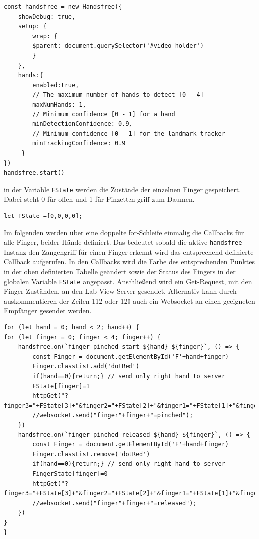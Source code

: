 \documentclass[a4paper,12pt,final]{article} %
\numberwithin{equation}{section} %
\numberwithin{figure}{section} %
\numberwithin{table}{section} %
\begin{document}
\begin{lstlisting}[firstnumber=79]
const handsfree = new Handsfree({
	showDebug: true,
	setup: {
		wrap: {
		$parent: document.querySelector('#video-holder')
		}
	},
	hands:{
		enabled:true,
		// The maximum number of hands to detect [0 - 4]
		maxNumHands: 1,
		// Minimum confidence [0 - 1] for a hand 
		minDetectionConfidence: 0.9,
		// Minimum confidence [0 - 1] for the landmark tracker
		minTrackingConfidence: 0.9
	 }
})
handsfree.start()
\end{lstlisting}

in der Variable \texttt{FState} werden die Zustände der einzelnen Finger gespeichert. Dabei steht 0 für offen und 1 für Pinzetten-griff zum Daumen.
\begin{lstlisting}[firstnumber=101]
let FState =[0,0,0,0];
\end{lstlisting}

Im folgenden werden über eine doppelte for-Schleife einmalig die Callbacks für alle Finger, beider Hände definiert.  Das bedeutet sobald die aktive \texttt{handsfree}-Instanz den Zangengriff für einen Finger erkennt wird das entsprechend definierte Callback aufgerufen.
In den Callbacks wird die Farbe des entsprechenden Punktes in der oben definierten Tabelle geändert sowie der Status des Fingers in der globalen Variable \texttt{FState} angepasst. 
Anschließend wird ein Get-Request, mit den Finger Zuständen, an den Lab-View Server gesendet.
Alternativ kann durch auskommentieren der Zeilen 112 oder 120 auch ein Websocket an einen geeigneten Empfänger gesendet werden.

\begin{lstlisting}[firstnumber=104]
for (let hand = 0; hand < 2; hand++) {
for (let finger = 0; finger < 4; finger++) {
	handsfree.on(`finger-pinched-start-${hand}-${finger}`, () => {
		const Finger = document.getElementById('F'+hand+finger)
		Finger.classList.add('dotRed')
		if(hand==0){return;} // send only right hand to server
		FState[finger]=1
		httpGet("?finger3="+FState[3]+"&finger2="+FState[2]+"&finger1="+FState[1]+"&finger0="+FState[0])
		//websocket.send("finger"+finger+"=pinched");
	})
	handsfree.on(`finger-pinched-released-${hand}-${finger}`, () => {
		const Finger = document.getElementById('F'+hand+finger)
		Finger.classList.remove('dotRed')
		if(hand==0){return;} // send only right hand to server
		FingerState[finger]=0
		httpGet("?finger3="+FState[3]+"&finger2="+FState[2]+"&finger1="+FState[1]+"&finger0="+FState[0])
		//websocket.send("finger"+finger+"=released");
	})
}
}
\end{lstlisting}
\end{document}
